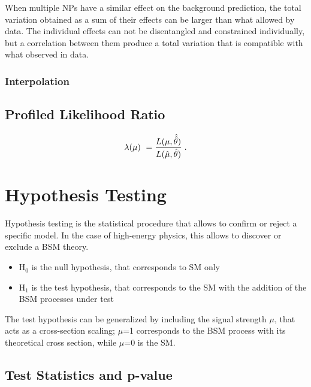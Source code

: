 When multiple NPs have a similar effect on the background prediction, the total variation obtained as a sum of their effects can be larger than what allowed by data. The individual effects can not be disentangled and constrained individually, but a correlation between them produce a total variation that is compatible with what observed in data. %

\subsubsection*{Interpolation}

\subsection{Profiled Likelihood Ratio}

\begin{equation}
\label{eq:stat:prl}
\lambda(\mu) \  = \frac{ L(\mu,
\hat{\hat{\theta}}) } {L(\hat{\mu}, \hat{\theta}) } \;.
\end{equation}


\section{Hypothesis Testing}
\label{sec:stat:ht}

Hypothesis testing is the statistical procedure that allows to confirm or reject a specific model. In the case of high-energy physics, this allows to discover or exclude a BSM theory. 

\begin{itemize}
\item H$_0$ is the null hypothesis, that corresponds to SM only
\item H$_1$ is the test hypothesis, that corresponds to the SM with the addition of the BSM processes under test
\end{itemize}

\noindent The test hypothesis can be generalized by including the signal strength $\mu$, that acts as a cross-section scaling; $\mu$=1 corresponds to the BSM process with its theoretical cross section, while $\mu$=0 is the SM.

\subsection{Test Statistics and p-value}

